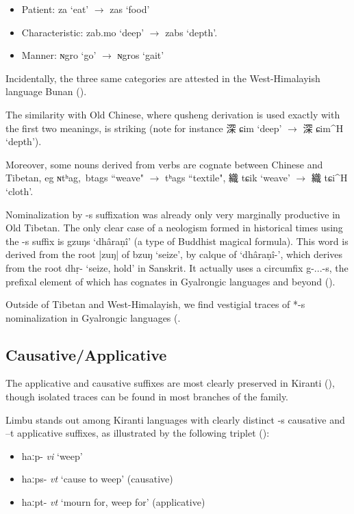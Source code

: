 \documentclass[oldfontcommands,oneside,a4paper,11pt]{article}
\newcommand{\ipa}[1]{{\phon \mbox{#1}}} %
\newcommand{\zh}[1]{{\cn #1}}
\newcommand{\ch}[3]{\zh{#1} \ipa{#2} `#3'}
\begin{document}
\begin{itemize}
\item Patient: \ipa{za} `eat' $\rightarrow$ \ipa{zas} `food' 
\item Characteristic: \ipa{zab.mo} `deep'  $\rightarrow$ \ipa{zabs} `depth'.
\item Manner: \ipa{ɴgro} `go'  $\rightarrow$ \ipa{ɴgros} `gait' 
 \end{itemize}
 
Incidentally, the three same categories are attested in the West-Himalayish language Bunan (\citealt[179-180]{widmer14bunan}).

The similarity with Old Chinese, where qusheng derivation is used exactly with the first two meanings, is striking (note for instance \ch{深}{ɕim}{deep} $\rightarrow$ \ch{深}{ɕim^H}{depth}).

Moreover, some nouns derived from verbs are cognate between Chinese and Tibetan, eg \ipa{ɴtʰag, btags} ``weave" $\rightarrow$ \ipa{tʰags} ``textile", \ch{織}{tɕik}{weave} $\rightarrow$ \ch{織}{tɕi^H}{cloth}.

Nominalization by \ipa{-s} suffixation was already only very marginally productive in Old Tibetan. The only clear case of a neologism formed in historical times using the \ipa{-s} suffix is \ipa{gzuŋs} `dhâraṇî' (a type of Buddhist magical formula). This word is derived from the root \ipa{|zuŋ|} of \ipa{bzuŋ} `seize', by calque of `dhâraṇî-', which derives from the root dhṛ- `seize, hold' in Sanskrit. It actually uses a circumfix \ipa{g-...-s}, the prefixal element of which has cognates in Gyalrongic languages and beyond (\citealt{konnerth09nmlz, jacques14snom}).

Outside of Tibetan and West-Himalayish, we find vestigial traces of *\ipa{-s} nominalization in Gyalrongic languages (\citealt{jacques03s.houzhui, jackson14morpho}.

 \subsection{Causative/Applicative} \label{sec:causative}
The applicative and causative suffixes are most clearly preserved in Kiranti (\citealt{michailovsky85dental, jacques15derivational.khaling}), though isolated traces can be found in most branches of the family.

Limbu stands out among Kiranti languages with clearly distinct \ipa{-s} causative and \ipa{--t} applicative suffixes, as illustrated by the following triplet (\citealt{michailovsky02dico}):
\begin{itemize}
\item \ipa{haːp-} \textit{vi} `weep'
\item \ipa{haːps-} \textit{vt} `cause to weep' (causative)
\item \ipa{haːpt-} \textit{vt} `mourn for, weep for' (applicative)
\end{itemize}
\end{document}
